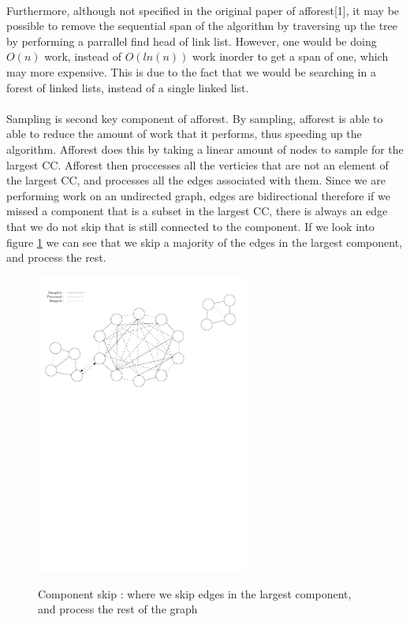 \documentclass[]{article}
\begin{document}
\paragraph{}
Furthermore, although not specified in the original paper of afforest[1], it may be possible to remove the sequential span of the algorithm by traversing up the tree by performing a parrallel find head of link list. However, one would be doing $O(n)$ work, instead of $O(ln(n))$ work inorder to get a span of one, which may more expensive. This is due to the fact that we would be searching in a forest of linked lists, instead of a single linked list.

\paragraph{}
Sampling is second key component of afforest. By sampling, afforest is able to able to reduce the amount of work that it performs, thus speeding up the algorithm. Afforest does this by taking a linear amount of nodes to sample for the largest CC. Afforest then proccesses all the verticies that are not an element of the largest CC, and processes all the edges associated with them. Since we are performing work on an undirected graph, edges are bidirectional therefore if we missed a component that is a subset in the largest CC, there is always an edge that we do not skip that is still connected to the component. If we look into figure \ref{fig-skip} we can see that we skip a majority of the edges in the largest component, and process the rest.


\begin{figure}[H]%
    \centering
    {\includegraphics[width=7cm]{fig-4} }%
    \caption{Component skip : where we skip edges in the largest component, and process the rest of the graph}
    \label{fig-skip}%
\end{figure}
\end{document}
